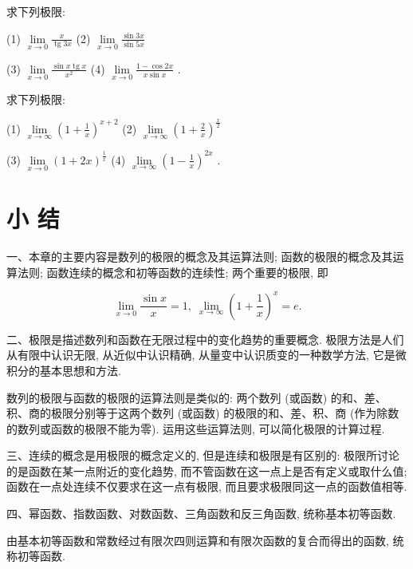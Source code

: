 \documentclass[lang=cn,newtx,10pt,scheme=chinese]{elegantbook}
\begin{document}
\begin{problemset}[习 题 三]
\item 求下列极限:

(1) \(\mathop{\lim }\limits_{{x \rightarrow 0}}\frac{x}{\operatorname{tg}{3x}}\) (2) \(\mathop{\lim }\limits_{{x \rightarrow 0}}\frac{\sin {3x}}{\sin {5x}}\)

(3) \(\mathop{\lim }\limits_{{x \rightarrow 0}}\frac{\sin x\operatorname{tg}x}{{x}^{2}}\) (4) \(\mathop{\lim }\limits_{{x \rightarrow 0}}\frac{1 - \cos {2x}}{x\sin x}\) .

\item 求下列极限:

(1) \(\mathop{\lim }\limits_{{x \rightarrow \infty }}{\left( 1 + \frac{1}{x}\right) }^{x + 2}\) (2) \(\mathop{\lim }\limits_{{x \rightarrow \infty }}{\left( 1 + \frac{2}{x}\right) }^{\frac{x}{2}}\)

(3) \(\mathop{\lim }\limits_{{x \rightarrow 0}}{\left( 1 + 2x\right) }^{\frac{1}{x}}\) (4) \(\mathop{\lim }\limits_{{x \rightarrow \infty }}{\left( 1 - \frac{1}{x}\right) }^{2x}\) .
\end{problemset}

\chapter*{小 结}

一、本章的主要内容是数列的极限的概念及其运算法则; 函数的极限的概念及其运算法则; 函数连续的概念和初等函数的连续性; 两个重要的极限, 即

\[
\mathop{\lim }\limits_{{x \rightarrow 0}}\frac{\sin x}{x} = 1,\;\mathop{\lim }\limits_{{x \rightarrow \infty }}{\left( 1 + \frac{1}{x}\right) }^{x} = e.
\]

二、极限是描述数列和函数在无限过程中的变化趋势的重要概念. 极限方法是人们从有限中认识无限, 从近似中认识精确, 从量变中认识质变的一种数学方法, 它是微积分的基本思想和方法.

数列的极限与函数的极限的运算法则是类似的: 两个数列 (或函数) 的和、差、积、商的极限分别等于这两个数列 (或函数) 的极限的和、差、积、商 (作为除数的数列或函数的极限不能为零). 运用这些运算法则, 可以简化极限的计算过程.

三、连续的概念是用极限的概念定义的, 但是连续和极限是有区别的: 极限所讨论的是函数在某一点附近的变化趋势, 而不管函数在这一点上是否有定义或取什么值; 函数在一点处连续不仅要求在这一点有极限, 而且要求极限同这一点的函数值相等.

四、幂函数、指数函数、对数函数、三角函数和反三角函数, 统称基本初等函数.

由基本初等函数和常数经过有限次四则运算和有限次函数的复合而得出的函数, 统称初等函数.
\end{document}
